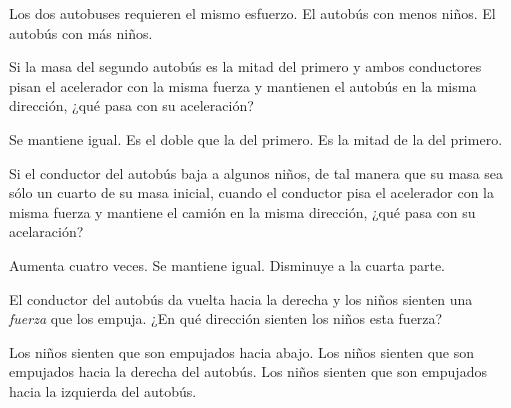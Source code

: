 \begin{multicols}{2}
\begin{parts}
        \begin{choices}
            \choice Los dos autobuses requieren el mismo esfuerzo.
            \choice  El autobús con menos niños.
            \choice El autobús con más niños.
        \end{choices}

        Si la masa del segundo autobús es la mitad del primero
        y ambos conductores pisan el acelerador con la misma fuerza y mantienen el autobús en la misma dirección, ¿qué pasa con su aceleración?

        \begin{choices}
            \choice Se mantiene igual.
            \choice Es el doble que la del primero.
            \choice Es la mitad de la del primero.
        \end{choices}

        Si el conductor del autobús baja a algunos niños,
        de tal manera que su masa sea sólo un cuarto de su masa inicial, cuando el conductor pisa el acelerador con la misma fuerza y mantiene el camión en la misma dirección, ¿qué pasa con su acelaración?

        \begin{choices}
            \choice Aumenta cuatro veces.
            \choice Se mantiene igual.
            \choice Disminuye a la cuarta parte.
        \end{choices}

        El conductor del autobús da vuelta hacia la derecha y los niños
        sienten una \emph{fuerza} que los empuja. ¿En qué dirección sienten los niños esta fuerza?

        \begin{choices}
            \choice Los niños sienten que son empujados hacia abajo.
            \choice Los niños sienten que son empujados hacia la derecha del autobús.
            \choice Los niños sienten que son empujados hacia la izquierda del autobús.
        \end{choices}
    \end{parts}
\end{multicols}
